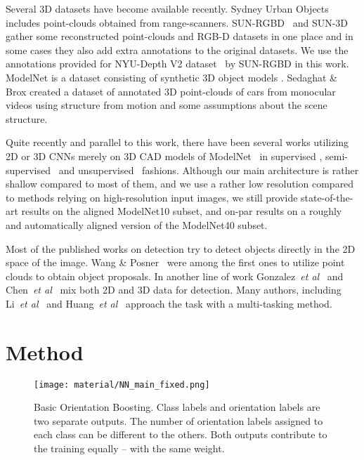 \documentclass{bmvc2k}
\def\etal{\emph{et al}\bmvaOneDot}
\begin{document}
Several 3D datasets have become available recently. Sydney Urban Objects~\cite{dedeuge_unsupervised_2013} includes point-clouds obtained from range-scanners. SUN-RGBD~\cite{song2015sun} and SUN-3D~\cite{xiao2013sun3d} gather some reconstructed point-clouds and RGB-D datasets in one place and in some cases they also add extra annotations to the original datasets. We use the annotations provided for NYU-Depth V2 dataset~\cite{silberman_indoor_2012-1} by SUN-RGBD in this work. ModelNet is a dataset consisting of synthetic 3D object models  \cite{wu_3D_2015}. Sedaghat \& Brox \cite{Sedaghat2015} created a dataset of annotated 3D point-clouds of cars from monocular videos using structure from motion and some assumptions about the scene structure.

Quite recently and parallel to this work, there have been several works utilizing 2D or 3D CNNs merely on 3D CAD models of ModelNet~\cite{wu_3D_2015} in supervised \cite{hegde_fusionnet_2016,brock_generative_2016,garcia_garcia_pointnet_2016}, semi-supervised~\cite{ravanbakhsh_deep_2016} and unsupervised~\cite{wu_learning_2016} fashions. Although our main architecture is rather shallow compared to most of them, and we use a rather low resolution compared to methods relying on high-resolution input images, we still provide state-of-the-art results on the aligned ModelNet10 subset, and on-par results on a roughly and automatically aligned version of the ModelNet40 subset.

Most of the published works on detection try to detect objects directly in the 2D space of the image. Wang \& Posner~\cite{wang2015voting} were among the first ones to utilize point clouds to obtain object proposals. In another line of work Gonzalez~\etal~\cite{gonzalez_multiview_2015} and Chen~\etal~\cite{chen_multi-view_2016} mix both 2D and 3D data for detection. Many authors, including Li~\etal~\cite{li_deep_2016} and Huang~\etal~\cite{huang_densebox_2015} approach the task with a multi-tasking method.


\section{Method}
\begin{figure*}[!t]
  \begin{center}
    \texttt{[image: material/NN\_main\_fixed.png]}
  \end{center}
  \caption{Basic Orientation Boosting. Class labels and orientation labels are two separate outputs. The number of orientation labels assigned to each class can be different to the others. Both outputs contribute to the training equally -- with the same weight.}
  \label{fig:net1}
\end{figure*}
\end{document}
